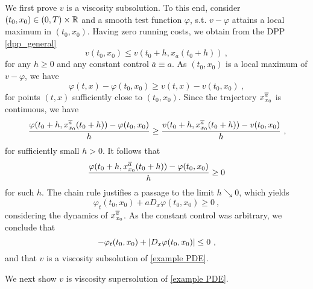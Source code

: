 \begin{example}
	We first prove $ v $ is a viscosity subsolution. To this end, consider $ (t_0, x_0) \in \left(0, T\right) \times \mathbb{R} $ and a smooth test function $ \varphi $, s.t. $ v - \varphi $ attains a local maximum in $ (t_0, x_0) $. Having zero running costs, we obtain from the DPP \eqref{dpp_general}
	\begin{equation*}
		v(t_0, x_0) \leq v(t_0 + h, x_{\overline{a}}(t_0 + h)) \ ,
	\end{equation*}
	for any $ h \geq 0 $ and any constant control $ \overline{a} \equiv a $. As $ (t_0, x_0) $ is a local maximum of $ v - \varphi $, we have
	\begin{equation*}
		\varphi(t, x) - \varphi(t_0, x_0) \geq v(t, x) - v(t_0, x_0) \ ,
	\end{equation*}
	for points $ (t, x) $ sufficiently close to $ (t_0, x_0) $. Since the trajectory $ x_{x_0}^{\overline{a}} $ is continuous, we have
	\begin{equation*}
		\frac{\varphi(t_0 + h, x_{x_0}^{\overline{a}}(t_0 + h)) - \varphi(t_0, x_0)}{h} \geq \frac{v(t_0 + h, x_{x_0}^{\overline{a}}(t_0 + h)) - v(t_0, x_0)}{h} \ ,
	\end{equation*}
	for sufficiently small $ h > 0 $. It follows that
	\begin{equation*}
		\frac{\varphi(t_0 + h, x_{x_0}^{\overline{a}}(t_0 + h)) - \varphi(t_0, x_0)}{h} \geq 0 
	\end{equation*}
	for such $ h $. The chain rule justifies a passage to the limit $ h \searrow 0 $, which yields
	\begin{equation*}
	\varphi_t(t_0, x_0) + a D_x \varphi(t_0, x_0) \geq 0 \ ,
	\end{equation*}
	considering the dynamics of $ x_{x_0}^{\overline{a}} $. As the constant control was arbitrary, we conclude that
	\begin{equation*}
		- \varphi_t(t_0, x_0) + \left\lvert {D_x \varphi(t_0, x_0)} \right\rvert \leq 0 \ ,
	\end{equation*}
	and that $ v $ is a viscosity subsolution of \eqref{example PDE}.
	
	We next show $ v $ is viscosity supersolution of \eqref{example PDE}.
	

\end{example}
